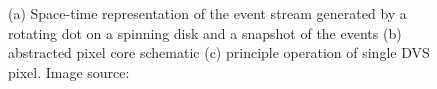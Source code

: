 \begin{figure}[t!]
	\centering
	\par\medskip
	\begin{minipage}{.48\columnwidth}
		\centering
	\end{minipage}%
	\begin{minipage}{.48\columnwidth}
		\centering
	\end{minipage}\par\medskip
	\caption{(a) Space-time representation of the event stream generated by a rotating dot on a spinning disk and a snapshot of the events (b) abstracted pixel core schematic (c) principle operation of single \ac{DVS} pixel. Image source: \cite{Lichtsteiner2008}}
	\label{fig:DVS_with_schem}
\end{figure}
